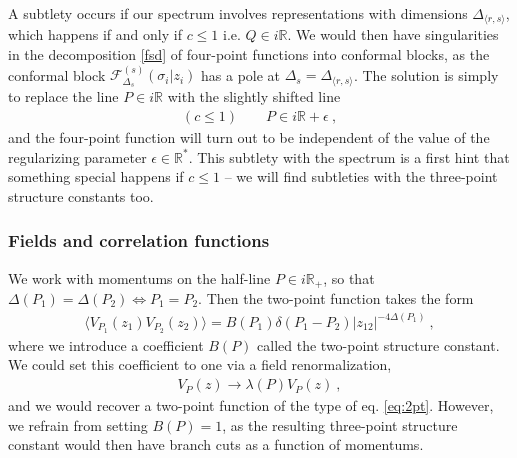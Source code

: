 \documentclass[12pt, a4paper, notitlepage, twoside]{report}
\numberwithin{equation}{section}
\theoremstyle{break}
\begin{document}
A subtlety occurs if our spectrum involves representations with dimensions $\Delta_{\langle r, s\rangle}$, which happens if and only if $c\leq 1$ i.e. $Q\in i\mathbb{R}$. 
We would then have singularities in the decomposition \eqref{fsd} of four-point functions into conformal blocks, as the conformal block $\mathcal{F}_{\Delta_s}^{(s)}(\sigma_i|z_i)$ has a pole at $\Delta_s = \Delta_{\langle r, s\rangle}$. 
The solution is simply to replace the line $P\in i\mathbb{R}$ with the slightly shifted line 
\begin{align}
 (c\leq 1) \qquad P \in i\mathbb{R} + \epsilon\ ,
\end{align}
and the four-point function will turn out to be independent of the value of the regularizing parameter $\epsilon \in \mathbb{R}^*$. 
This subtlety with the spectrum is a first hint that something special happens if $c\leq 1$ -- we will find subtleties with the three-point structure constants too. 


\subsubsection{Fields and correlation functions}

We work with momentums on the half-line $P\in i\mathbb{R}_+$, so that $\Delta(P_1)=\Delta(P_2)\iff P_1=P_2$. 
Then the two-point function takes the form
\begin{align}
 \Big\langle V_{P_1}(z_1) V_{P_2}(z_2)\Big\rangle = B(P_1)\delta(P_1-P_2) |z_{12}|^{-4\Delta(P_1)}\ , 
\label{vvc}
\end{align}
where we introduce a coefficient $B(P)$ called the two-point structure constant. 
We could set this coefficient to one via a field renormalization,
\begin{align}
 V_P(z) \to \lambda(P)  V_P(z) \ ,
\label{vlv}
\end{align}
and we would recover a two-point function of the type of eq. \eqref{eq:2pt}. However, we refrain from setting $B(P)=1$, as the resulting three-point structure constant would then have branch cuts as a function of momentums.  
\end{document}

